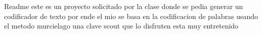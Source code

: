 Readme
este es un proyecto solicitado por la clase 
donde se pedia generar un codificador de texto por ende el mio se basa en la codificacion de palabras
usando el metodo murcielago una clave scout 
que lo disfruten esta muy entretenido 